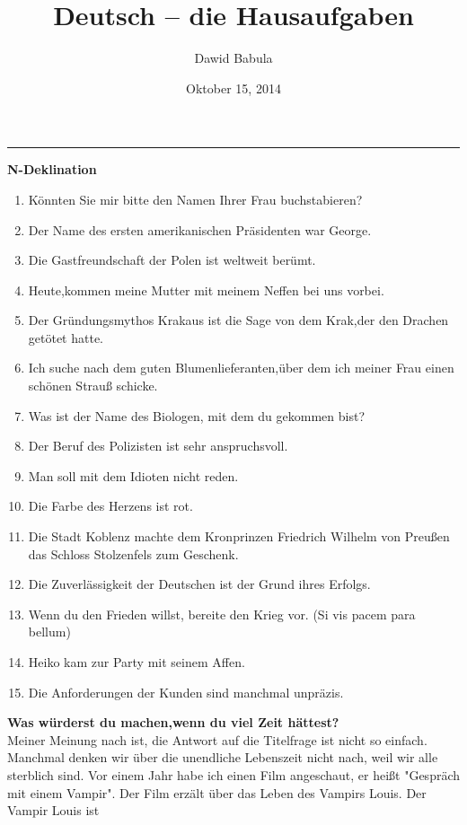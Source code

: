\documentclass[a4paper,12pt]{article}
\author{Dawid Babula}
\title{Deutsch -- die Hausaufgaben}
\date{Oktober 15, 2014}
\makeatletter
\def\thickhrulefill{\leavevmode \leaders \hrule height 1pt\hfill \kern \z@}
\def\maketitle{%
    \null
    \thispagestyle{empty}%
    \vfill
    \begin{center}\leavevmode
    \normalfont
    {\LARGE\raggedleft \@author\par}%
    \thickhrulefill\par
    {\huge\raggedright \@title\par}%
    \vskip 1cm
    \end{center}%
    \vfill
    {\Large \@date\par}%
    \null
    \cleardoublepage
    }
\makeatother
\begin{document}
\maketitle

\textbf{\large N-Deklination}
\vspace{2pc}
\begin{enumerate}
    \item K\"onnten Sie mir bitte den Namen Ihrer Frau buchstabieren?
    \item Der Name des ersten amerikanischen Pr\"asidenten war George.
    \item Die Gastfreundschaft der Polen ist weltweit ber\"umt.
    \item Heute,kommen meine Mutter mit meinem Neffen bei uns vorbei.
    \item Der Gr\"undungsmythos Krakaus ist die Sage von dem Krak,der den Drachen get\"otet hatte.
    \item Ich suche nach dem guten Blumenlieferanten,\"uber dem ich meiner Frau einen sch\"onen Strau{\ss} schicke.
    \item Was ist der Name des Biologen, mit dem du gekommen bist?
    \item Der Beruf des Polizisten ist sehr anspruchsvoll.
    \item Man soll mit dem Idioten nicht reden.
    \item Die Farbe des Herzens ist rot.
    \item Die Stadt Koblenz machte dem Kronprinzen Friedrich Wilhelm von Preu{\ss}en das Schloss Stolzenfels zum Geschenk.
    \item Die Zuverl\"assigkeit der Deutschen ist der Grund ihres Erfolgs.
    \item Wenn du den Frieden willst, bereite den Krieg vor. (Si vis pacem para bellum)
    \item Heiko kam zur Party mit seinem Affen.
    \item Die Anforderungen der Kunden sind manchmal unpr\"azis.
\end{enumerate}
\newpage
\textbf{\large Was w\"urderst du machen,wenn du viel Zeit h\"attest?}
\vspace{2pc}
\\{}
Meiner Meinung nach ist, die Antwort auf die Titelfrage ist nicht so einfach. Manchmal denken wir \"uber die unendliche Lebenszeit nicht nach, weil wir alle sterblich sind.
Vor einem Jahr habe ich einen Film angeschaut, er hei{\ss}t "Gespr\"ach mit einem Vampir". Der Film erz\"alt \"uber das Leben des Vampirs Louis. Der Vampir Louis ist
\end{document}
